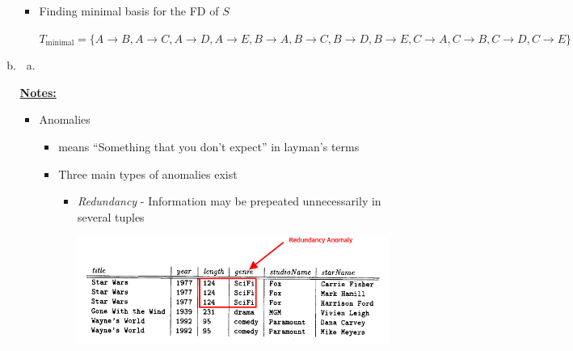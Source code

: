 \documentclass[12pt]{article}
\begin{document}
\begin{enumerate}[1.]
\begin{enumerate}[a)]
\begin{itemize}
            \item Finding minimal basis for the FD of $S$

            $T_{\text{minimal}} = \{
                    A \to B,
                    A \to C,
                    A \to D,
                    A \to E,
                    B \to A,
                    B \to C,
                    B \to D,
                    B \to E,
                    C \to A,
                    C \to B,
                    C \to D,
                    C \to E
            \}$

        \end{itemize}

        \item

        \begin{enumerate}[a)]

            \item


        \end{enumerate}

        \bigskip

        \underline{\textbf{Notes:}}

        \bigskip

        \begin{itemize}
            \item Anomalies
            \begin{itemize}
                \item means ``Something that you don't expect'' in layman's terms
                \item Three main types of anomalies exist
                \begin{itemize}
                    \item \textit{Redundancy} - Information may be prepeated unnecessarily in several tuples

                    \bigskip

                    \begin{center}
                    \includegraphics[width=0.7\linewidth]{images/worksheet_12_solution_3.png}
                    \end{center}


\end{itemize}
\end{itemize}
\end{itemize}
\end{enumerate}
\end{enumerate}
\end{document}
